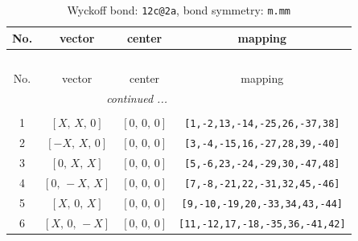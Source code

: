 \documentclass[fleqn,8pt]{jsarticle}
\begin{document}
\begin{longtable}{cccc}
\caption{Wyckoff bond: {\tt 12c@2a}, bond symmetry: {\tt m.mm}}
 \\
 \hline \hline
No. & vector & center & mapping \\ \hline \endfirsthead

\multicolumn{3}{l}{\tablename\ \thetable{}} \\
 \hline \hline
No. & vector & center & mapping \\ \hline \endhead

 \hline \hline
\multicolumn{3}{r}{\footnotesize\it continued ...} \\ \endfoot

 \hline \hline
\multicolumn{3}{r}{} \\ \endlastfoot

1 & $\left[ X,\, X,\, 0 \right]$ & $\left[ 0,\, 0,\, 0 \right]$ & {\tt [1,-2,13,-14,-25,26,-37,38]} \\ \hline
2 & $\left[ - X,\, X,\, 0 \right]$ & $\left[ 0,\, 0,\, 0 \right]$ & {\tt [3,-4,-15,16,-27,28,39,-40]} \\ \hline
3 & $\left[ 0,\, X,\, X \right]$ & $\left[ 0,\, 0,\, 0 \right]$ & {\tt [5,-6,23,-24,-29,30,-47,48]} \\ \hline
4 & $\left[ 0,\, - X,\, X \right]$ & $\left[ 0,\, 0,\, 0 \right]$ & {\tt [7,-8,-21,22,-31,32,45,-46]} \\ \hline
5 & $\left[ X,\, 0,\, X \right]$ & $\left[ 0,\, 0,\, 0 \right]$ & {\tt [9,-10,-19,20,-33,34,43,-44]} \\ \hline
6 & $\left[ X,\, 0,\, - X \right]$ & $\left[ 0,\, 0,\, 0 \right]$ & {\tt [11,-12,17,-18,-35,36,-41,42]} \\
\end{longtable}
\renewcommand{\arraystretch}{1.2}
\end{document}

